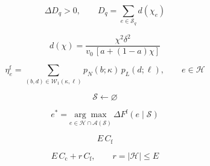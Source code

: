 \documentclass[12pt]{article}
\begin{document}
\begin{equation*}\displaystyle \Delta D_q>0,\qquad D_q=\sum_{e\in\mathcal S_q}d(\chi_e)\end{equation*}

\begin{equation*}\displaystyle d(\chi)=\frac{\chi^2\delta^2}{v_0\,[a+(1-a)\chi]}\end{equation*}

\begin{equation*}\displaystyle \eta_e^{\mathrm f}=\sum_{(b,d)\in\mathcal W_1(\kappa,\ell)}p_N(b;\kappa)\,p_L(d;\ell),\qquad e\in\mathcal H\end{equation*}

\begin{equation*}\displaystyle \mathcal S\leftarrow\varnothing\end{equation*}

\begin{equation*}\displaystyle e^*=\underset{e\in\mathcal H\cap\mathcal A(\mathcal S)}{\arg\max}\ \Delta F^{\mathrm f}(e\mid\mathcal S)\end{equation*}

\begin{equation*}\displaystyle E\,C_{\mathrm f}\end{equation*}

\begin{equation*}\displaystyle E\,C_{\mathrm c}+r\,C_{\mathrm f},\qquad r=|\mathcal H|\le E\end{equation*}
\end{document}
